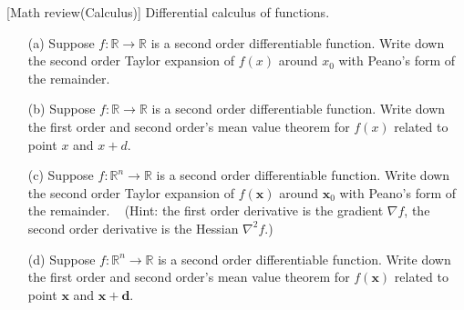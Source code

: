 \item {} [Math review(Calculus)] Differential calculus of functions.

\begin{itemize}
    \item[(a)] Suppose $f: \mathbb{R} \rightarrow \mathbb{R}$ is a second order differentiable function. Write down the second order Taylor expansion of $f(x)$ around $x_0$ with Peano's form of the remainder. ~
    \item[(b)] Suppose $f: \mathbb{R} \rightarrow \mathbb{R}$ is a second order differentiable function. Write down the first order and second order's mean value theorem for $f(x)$ related to point $x$ and $x+d$. ~
    \item[(c)] Suppose $f: \mathbb{R}^n\rightarrow \mathbb{R}$ is a second order differentiable function. Write down the second order Taylor expansion of $f(\mathbf{x})$ around $\mathbf{x}_0$ with Peano's form of the remainder. ~ (Hint: the first order derivative is the gradient $\nabla f$, the second order derivative is the Hessian $\nabla^2 f$.)
    \item[(d)] Suppose $f: \mathbb{R}^n\rightarrow \mathbb{R}$ is a second order differentiable function. Write down the first order and second order's mean value theorem for $f(\mathbf{x})$ related to point $\mathbf{x}$ and $\mathbf{x}+\mathbf{d}$. ~
\end{itemize}

\solution








\newpage